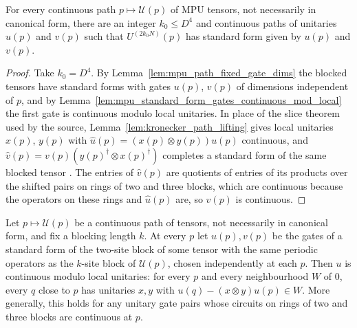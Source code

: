\begin{corollary}
    \label{coruvSF}
    \leanok
    For every continuous path $p\mapsto\mathcal U(p)$ of MPU tensors, not
    necessarily in canonical form, there are an integer $k_0\leq D^4$ and
    continuous paths of unitaries $u(p)$ and $v(p)$ such that
    $U^{(2k_0N)}(p)$ has standard form given by $u(p)$ and $v(p)$.
\end{corollary}

\begin{proof}\leanok
    Take $k_0=D^4$. By Lemma~\ref{lem:mpu_path_fixed_gate_dims} the blocked
    tensors have standard forms with gates $u(p)$, $v(p)$ of dimensions
    independent of $p$, and by
    Lemma~\ref{lem:mpu_standard_form_gates_continuous_mod_local} the first gate
    is continuous modulo local unitaries. In place of the slice theorem used by
    the source, Lemma~\ref{lem:kronecker_path_lifting} gives local unitaries
    $x(p)$, $y(p)$ with $\hat u(p)=(x(p)\otimes y(p))u(p)$ continuous, and
    $\hat v(p)=v(p)(y(p)^\dagger\otimes x(p)^\dagger)$ completes a standard form
    of the same blocked tensor \cite{gap:mpu_standard_form_path_cross_section}.
    The entries of $\hat v(p)$ are quotients of entries of its products over the
    shifted pairs on rings of two and three blocks, which are continuous because
    the operators on these rings and $\hat u(p)$ are, so $\hat v(p)$ is
    continuous.
\end{proof}

\begin{lemma}
    \label{lem:mpu_standard_form_gates_continuous_mod_local}
    \leanok
    Let $p\mapsto\mathcal U(p)$ be a continuous path of tensors, not
    necessarily in canonical form, and fix a blocking length $k$. At every $p$
    let $u(p),v(p)$ be the gates of a standard form of the two-site block of
    some tensor with the same periodic operators as the $k$-site block of
    $\mathcal U(p)$, chosen independently at each $p$. Then $u$ is continuous
    modulo local unitaries: for every $p$ and every neighbourhood $W$ of $0$,
    every $q$ close to $p$ has unitaries $x,y$ with
    $u(q)-(x\otimes y)u(p)\in W$. More generally, this holds for any unitary
    gate pairs whose circuits on rings of two and three blocks are continuous
    at $p$.
\end{lemma}

